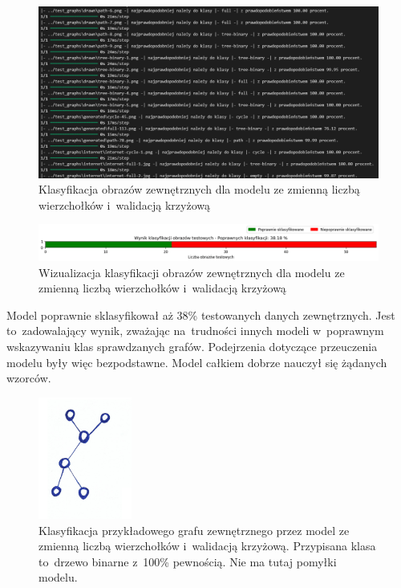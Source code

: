 \begin{figure}[ht]
	\centering
	\includegraphics[width=15.5cm]{resources/tests/images/v3/multiple_edges_crossvalid_txt.png}
	\caption{Klasyfikacja obrazów zewnętrznych dla modelu ze zmienną liczbą wierzchołków i~walidacją krzyżową}
	\label{Fig:tests-csvar-0b}
\end{figure}
\FloatBarrier

\begin{figure}[ht]
	\centering
	\includegraphics[width=15.5cm]{resources/tests/images/v3/multiple_edges_crossvalid_bar.png}
	\caption{Wizualizacja klasyfikacji obrazów zewnętrznych dla modelu ze zmienną liczbą wierzchołków i~walidacją krzyżową}
	\label{Fig:tests-csvar-0c}
\end{figure}
\FloatBarrier

Model poprawnie sklasyfikował aż 38\% testowanych danych zewnętrznych.
Jest to~zadowalający wynik, zważając na~trudności innych modeli w~poprawnym wskazywaniu klas sprawdzanych grafów.
Podejrzenia dotyczące przeuczenia modelu były więc bezpodstawne.
Model całkiem dobrze nauczył się żądanych wzorców.

\begin{figure}[ht]
	\centering
	\includegraphics[height=4cm]{../graph_classification/test_graphs/drawn/tree-binary-5.png}
	\caption{Klasyfikacja przykładowego grafu zewnętrznego przez model ze zmienną liczbą wierzchołków i~walidacją krzyżową.
		Przypisana klasa to~drzewo binarne z~100\% pewnością. Nie ma tutaj pomyłki modelu.}
	\label{Fig:tests-csvar-0d}
\end{figure}
\FloatBarrier

